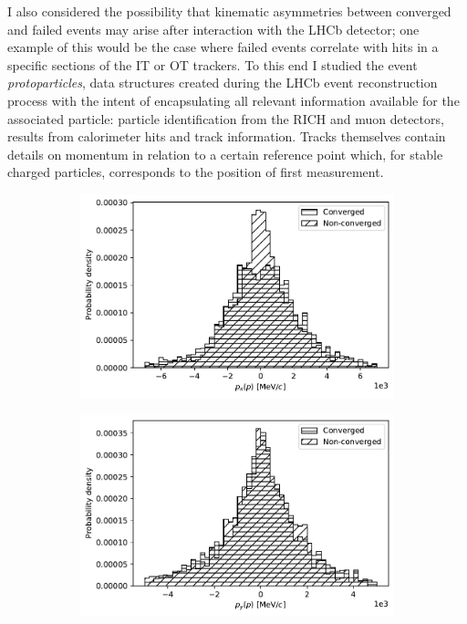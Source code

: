 I also considered the possibility that kinematic asymmetries between converged and failed events may arise after interaction with the LHCb detector;
one example of this would be the case where failed events correlate with hits in a specific sections of the IT or OT trackers.
To this end I studied the event \textit{protoparticles}, data structures created during the LHCb event reconstruction process with the intent of encapsulating all relevant information available for the associated particle:
particle identification from the RICH and muon detectors, results from calorimeter hits and track information.
Tracks themselves contain details on momentum in relation to a certain reference point which, for stable charged particles, corresponds to the position of first measurement.

\begin{figure}[t]
	\centering
	\begin{subfigure}{.45\textwidth}
		\includegraphics[width=\textwidth]{graphics/03-vertex_reconstruction/p_momentum_x.pdf}
		\caption{}
		\label{fig:3:p_momentum_x}
	\end{subfigure}
	\begin{subfigure}{.45\textwidth}
		\includegraphics[width=\textwidth]{graphics/03-vertex_reconstruction/p_momentum_y.pdf}

\end{subfigure}
\end{figure}
